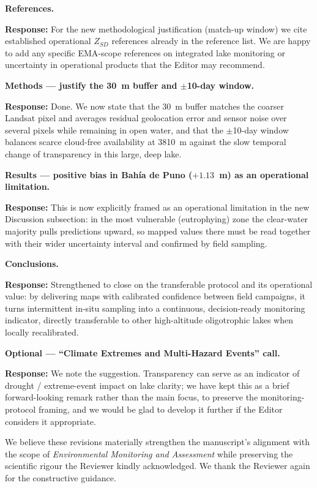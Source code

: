 \documentclass[11pt]{article}
\newcommand{\resp}[1]{\par\noindent\textcolor{blue!60!black}{\textbf{Response:}} #1\par\medskip}
\begin{document}
\textbf{References.}
\resp{For the new methodological justification (match-up window) we cite established
operational $Z_{SD}$ references already in the reference list. We are happy to add
any specific EMA-scope references on integrated lake monitoring or uncertainty in
operational products that the Editor may recommend.}

\textbf{Methods --- justify the 30~m buffer and $\pm$10-day window.}
\resp{Done. We now state that the 30~m buffer matches the coarser Landsat pixel and
averages residual geolocation error and sensor noise over several pixels while
remaining in open water, and that the $\pm$10-day window balances scarce cloud-free
availability at 3810~m against the slow temporal change of transparency in this
large, deep lake.}

\textbf{Results --- positive bias in Bah\'ia de Puno ($+1.13$~m) as an operational
limitation.}
\resp{This is now explicitly framed as an operational limitation in the new
Discussion subsection: in the most vulnerable (eutrophying) zone the clear-water
majority pulls predictions upward, so mapped values there must be read together with
their wider uncertainty interval and confirmed by field sampling.}

\textbf{Conclusions.}
\resp{Strengthened to close on the transferable protocol and its operational value:
by delivering maps with calibrated confidence between field campaigns, it turns
intermittent in-situ sampling into a continuous, decision-ready monitoring indicator,
directly transferable to other high-altitude oligotrophic lakes when locally
recalibrated.}

\textbf{Optional --- ``Climate Extremes and Multi-Hazard Events'' call.}
\resp{We note the suggestion. Transparency can serve as an indicator of drought /
extreme-event impact on lake clarity; we have kept this as a brief forward-looking
remark rather than the main focus, to preserve the monitoring-protocol framing,
and we would be glad to develop it further if the Editor considers it appropriate.}

\hrulefill

We believe these revisions materially strengthen the manuscript's alignment with the
scope of \textit{Environmental Monitoring and Assessment} while preserving the
scientific rigour the Reviewer kindly acknowledged. We thank the Reviewer again for
the constructive guidance.
\end{document}
